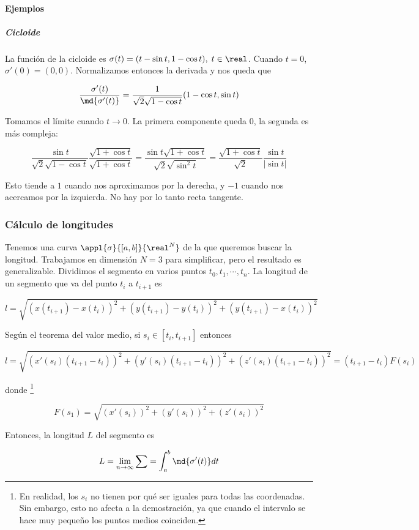 \documentclass[12pt,a4paper,titlepage]{apuntes}
\begin{document}
\paragraph{Ejemplos}
\subparagraph{Cicloide}

La función de la cicloide es $\sigma(t) = (t - \sin t, 1 - \cos t),\; t\in \real$. Cuando $t=0$, $\sigma'(0) = (0,0)$. Normalizamos entonces la derivada y nos queda que 

\[ \frac{\sigma'(t)}{\md{\sigma'(t)}} = \frac{1}{\sqrt{2}\sqrt{1 - \cos t}} (1 - \cos t, \sin t) \]

Tomamos el límite cuando $t\to 0$. La primera componente queda $0$, la segunda es más compleja:

\[ \frac{\sin t}{\sqrt{2}\sqrt{1 - \cos t}}\frac{ \sqrt{1 + \cos t}}{ \sqrt{1 + \cos t}} = \frac{\sin t \sqrt{1 + \cos t}}{\sqrt{2} \sqrt{\sin^2 t}} = \frac{\sqrt{1 + \cos t}}{\sqrt{2}} \frac{\sin t}{|\sin t |} \]

Esto tiende a $1$ cuando nos aproximamos por la derecha, y $-1$ cuando nos acercamos por la izquierda. No hay por lo tanto recta tangente.

\subsubsection{Cálculo de longitudes}
\label{refLong}
Tenemos una curva $\appl{\sigma}{[a,b]}{\real^N}$ de la que queremos buscar la longitud. Trabajamos en dimensión $N=3$ para simplificar, pero el resultado es generalizable. Dividimos el segmento en varios puntos $t_0, t_1, \cdots, t_n$. La longitud de un segmento que va del punto $t_i$ a $t_{i+1}$ es

\[ l = \sqrt{(x(t_{i+1}) - x(t_i) )^2 + (y(t_{i+1}) - y(t_i) )^2 + (y(t_{i+1}) - x(t_i) )^2} \]

Según el teorema del valor medio, si $s_i \in [t_i, t_{i+1}]$ entonces

\[ l = \sqrt{(x'(s_i)(t_{i+1}-t_i))^2+(y'(s_i)(t_{i+1}-t_i))^2+(z'(s_i)(t_{i+1}-t_i))^2} = (t_{i+1}-t_i)F(s_i) \]

donde \footnote{ En realidad, los $s_i$ no tienen por qué ser iguales para todas las coordenadas. Sin embargo, esto no afecta a la demostración, ya que cuando el intervalo se hace muy pequeño los puntos medios coinciden. }

\[ F(s_1) = \sqrt{(x'(s_i))^2+(y'(s_i))^2+(z'(s_i))^2} \]

Entonces, la longitud $L$ del segmento es 

\[ L = \lim_{n\to\infty} \sum = \int_a^b\md{\sigma'(t)}dt\]
\end{document}
